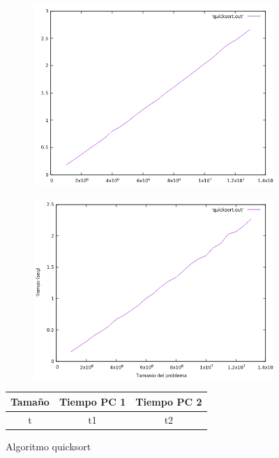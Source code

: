 \documentclass[12pt,spanish]{article}
\begin{document}
\begin{figure}[H]
\centering
\begin{subfigure}[b]{0.45\textwidth}
\includegraphics[scale=0.45]{empirica_quicksort.png}
\caption{}
\end{subfigure}
\quad
\begin{subfigure}[b]{0.45\textwidth}
\includegraphics[scale=0.45]{empirica_quicksort_2.png}
\caption{}
\end{subfigure}
\begin{tabular}{|c|c|c|}
\hline
\textbf{Tamaño} & \textbf{Tiempo PC 1} & \textbf{Tiempo PC 2} \\
\hline
t & t1 & t2 \\
\hline
\end{tabular}
\caption{Algoritmo quicksort}
\end{figure}
\end{document}
